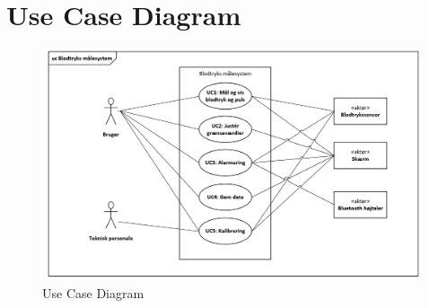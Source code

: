 \section{Use Case Diagram}
\vspace{0.5 cm}
\begin{figure}[h!]
	\centering
	\includegraphics{Kravspecifikation/Diagram.png}
	\caption{Use Case Diagram}
	\label{fig:Use_case_diagram}
\end{figure}